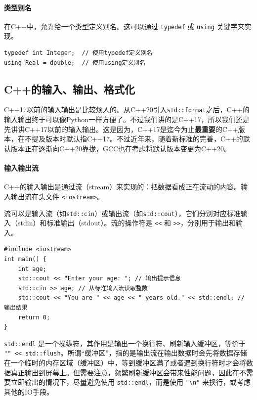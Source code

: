 \paragraph{类型别名}

在C++中，允许给一个类型定义别名。这可以通过 \verb|typedef| 或 \verb|using| 关键字来实现。

\begin{verbatim}
typedef int Integer;  // 使用typedef定义别名
using Real = double;  // 使用using定义别名
\end{verbatim}

\subsection{C++的输入、输出、格式化}

C++17以前的输入输出是比较烦人的。从C++20引入\verb|std::format|之后，C++的输入输出终于可以像Python一样方便了。不过我们讲的是C++17，所以我们还是先讲讲C++17以前的输入输出。这是因为，C++17是迄今为止\textbf{最重要}的C++版本，在不提及版本时默认指C++17。不过近年来，随着新标准的完善，C++的默认版本正在逐渐向C++20靠拢，GCC也在考虑将默认版本变更为C++20。

\paragraph{输入输出流}

C++的输入输出是通过流（stream）来实现的：把数据看成正在流动的内容。输入输出流在头文件 \verb|<iostream>|。

流可以是输入流（如\verb|std::cin|）或输出流（如\verb|std::cout|），它们分别对应标准输入（stdin）和标准输出（stdout）。流的操作符是 \verb|<<| 和 \verb|>>|，分别用于输出和输入。

\begin{verbatim}
#include <iostream>
int main() {
    int age;
    std::cout << "Enter your age: "; // 输出提示信息
    std::cin >> age; // 从标准输入流读取整数
    std::cout << "You are " << age << " years old." << std::endl; // 输出结果
    return 0;
}
\end{verbatim}

\texttt{std::endl} 是一个操纵符，其作用是输出一个换行符、刷新输入缓冲区，等价于 \texttt{"\n" << std::flush}。所谓“缓冲区”，指的是输出流在输出数据时会先将数据存储在一个临时的内存区域（缓冲区）中，等到缓冲区满了或者遇到换行符时才会将数据真正输出到屏幕上。但需要注意，频繁刷新缓冲区会带来性能问题，因此在不需要立即输出的情况下，尽量避免使用 \verb|std::endl|，而是使用 \verb|"\n"| 来换行，或考虑其他的IO手段。

